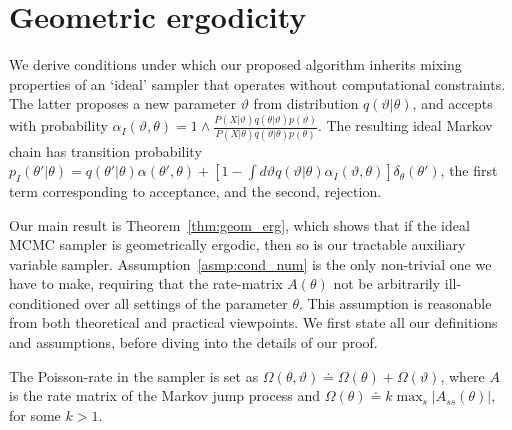 \newpage
\section{Geometric ergodicity}
We derive conditions under which our proposed algorithm
inherits mixing properties of an `ideal' sampler that operates without
computational constraints. The latter proposes a new parameter $\vartheta$
from distribution $q(\vartheta|\theta)$, and accepts with probability
$\alpha_I(\vartheta,\theta) = 1 \wedge \frac{P(X | \vartheta)q(\theta| \vartheta)p(\vartheta)}
      {P(X | \theta)q(\vartheta|\theta)p(\theta)}$. The resulting ideal
Markov chain has transition probability
$p_I(\theta'|\theta) = q(\theta'|\theta)\alpha(\theta',\theta) + \left[1-\int d\vartheta
q(\vartheta|\theta)\alpha_I(\vartheta,\theta)\right]\delta_\theta(\theta')$, the first
term corresponding to acceptance, and the second, rejection.

Our main result is Theorem~\ref{thm:geom_erg}, which shows that if the ideal MCMC
sampler is geometrically ergodic, then so is our tractable auxiliary
variable sampler. Assumption~\ref{asmp:cond_num} is the only non-trivial
one we have to make, requiring that the rate-matrix $A(\theta)$ not be
arbitrarily ill-conditioned over all
settings of the parameter $\theta$. This assumption is reasonable from
both theoretical and practical viewpoints.
We first state all our definitions and assumptions, before diving into the details
of our proof.
\begin{definition}
The Poisson-rate in the sampler is set as $\Omega(\theta, \vartheta) \doteq \Omega(\theta) + \Omega(\vartheta)$,
where $A$ is the rate matrix of the Markov jump process and $\Omega(\theta) \doteq k \max_s |A_{ss}(\theta)|$,
for some $k > 1$.
\label{def:poisson-rate}
\end{definition}

